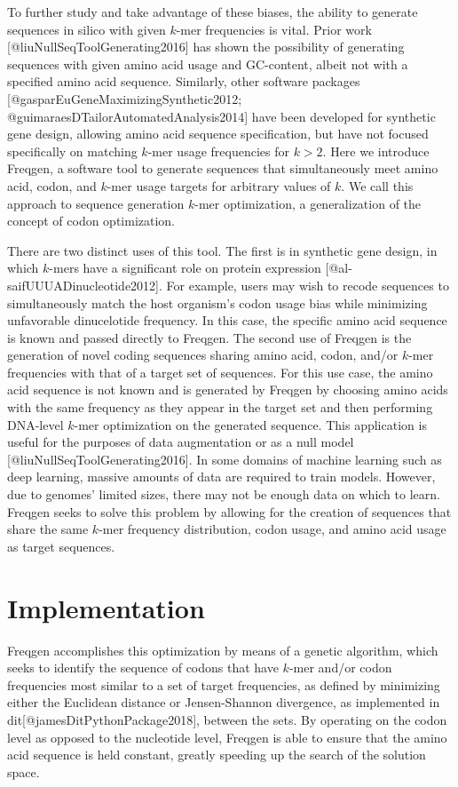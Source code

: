 \documentclass{bioinfo}
\begin{document}
To further study and take advantage of these biases, the ability to generate sequences in silico with given $k$-mer frequencies is vital. Prior work [@liuNullSeqToolGenerating2016] has shown the possibility of generating sequences with given amino acid usage and GC-content, albeit not with a specified amino acid sequence. Similarly, other software packages [@gasparEuGeneMaximizingSynthetic2012; @guimaraesDTailorAutomatedAnalysis2014] have been developed for synthetic gene design, allowing amino acid sequence specification, but have not focused specifically on matching $k$-mer usage frequencies for $k>2$. Here we introduce Freqgen, a software tool to generate sequences that simultaneously meet amino acid, codon, and $k$-mer usage targets for arbitrary values of $k$. We call this approach to sequence generation $k$-mer optimization, a generalization of the concept of codon optimization.

There are two distinct uses of this tool. The first is in synthetic gene design, in which $k$-mers have a significant role on protein expression [@al-saifUUUADinucleotide2012]. For example, users may wish to recode sequences to simultaneously match the host organism's codon usage bias while minimizing unfavorable dinucelotide frequency. In this case, the specific amino acid sequence is known and passed directly to Freqgen. The second use of Freqgen is the generation of novel coding sequences sharing amino acid, codon, and/or $k$-mer frequencies with that of a target set of sequences. For this use case, the amino acid sequence is not known and is generated by Freqgen by choosing amino acids with the same frequency as they appear in the target set and then performing DNA-level $k$-mer optimization on the generated sequence. This application is useful for the purposes of data augmentation or as a null model [@liuNullSeqToolGenerating2016]. In some domains of machine learning such as deep learning, massive amounts of data are required to train models. However, due to genomes' limited sizes, there may not be enough data on which to learn. Freqgen seeks to solve this problem by allowing for the creation of sequences that share the same $k$-mer frequency distribution, codon usage, and amino acid usage as target sequences.

\section{Implementation}

Freqgen accomplishes this optimization by means of a genetic algorithm, which seeks to identify the sequence of codons that have $k$-mer and/or codon frequencies most similar to a set of target frequencies, as defined by minimizing either the Euclidean distance or Jensen-Shannon divergence, as implemented in dit[@jamesDitPythonPackage2018], between the sets. By operating on the codon level as opposed to the nucleotide level, Freqgen is able to ensure that the amino acid sequence is held constant, greatly speeding up the search of the solution space.
\end{document}
